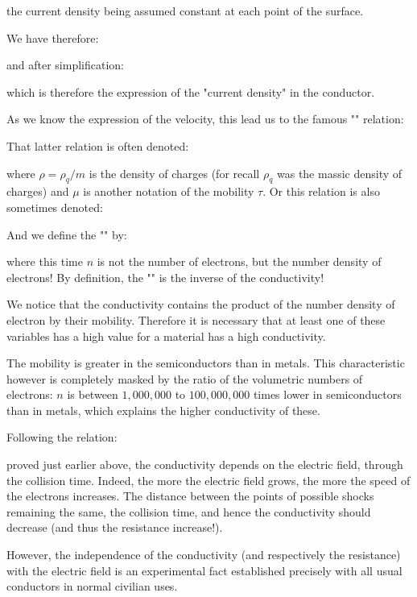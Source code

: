 	the current density being assumed constant at each point of the surface.
	
	We have therefore:
	
	and after simplification:
	
	which is therefore the expression of the "current density" in the conductor.

	As we know the expression of the velocity, this lead us to the famous "\label{drift current}" relation:
	 
	\begin{tcolorbox}[title=Remark,colframe=black,arc=10pt]
	That latter relation is often denoted:
	
	where $\rho=\rho_q/m$ is the density of charges (for recall $\rho_q$ was the massic density of charges) and $\mu$ is another notation of the mobility $\tau$. Or this relation is also sometimes denoted:
	
	\end{tcolorbox}
	And we define the "" by:
	
	where this time $n$ is not the number of electrons, but the number density of electrons! By definition, the "" is the inverse of the conductivity!
	
	We notice that the conductivity contains the product of the number density of electron by their mobility. Therefore it is necessary that at least one of these variables has a high value for a material has a high conductivity.
	
	The mobility is greater in the semiconductors than in metals. This characteristic however is completely masked by the ratio of the volumetric numbers of electrons: $n$ is between $1,000,000$ to $100,000,000$ times lower in semiconductors than in metals, which explains the higher conductivity of these.
	
	Following the relation:
	
	proved just earlier above, the conductivity depends on the electric field, through the collision time. Indeed, the more the electric field grows, the more the speed of the electrons increases. The distance between the points of possible shocks remaining the same, the collision time, and hence the conductivity should decrease (and thus the resistance increase!).
	
	However, the independence of the conductivity (and respectively the resistance) with the electric field is an experimental fact established precisely with all usual conductors in normal civilian uses.	
	
